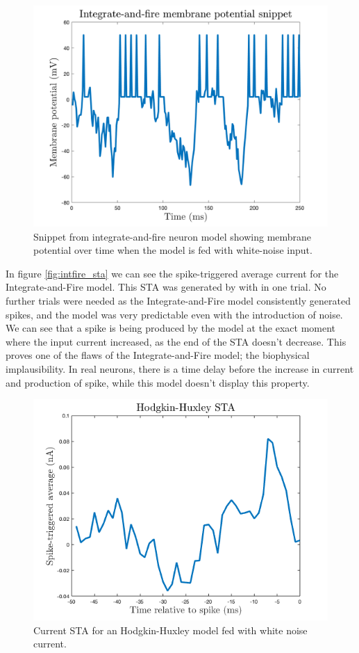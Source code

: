\documentclass[11pt]{article}
\begin{document}
\begin{figure}[H]
    \centering
    \includegraphics[width=5in]{figures/intfire_potential.png}
    \caption{Snippet from integrate-and-fire neuron model showing membrane potential over time when the model is fed with white-noise input.}
    \label{fig:intfire_potential}
\end{figure}

In figure \ref{fig:intfire_sta} we can see the spike-triggered average current for the Integrate-and-Fire model. This STA was generated by with in one trial. No further trials were needed as the Integrate-and-Fire model consistently generated spikes, and the model was very predictable even with the introduction of noise. We can see that a spike is being produced by the model at the exact moment where the input current increased, as the end of the STA doesn't decrease. This proves one of the flaws of the Integrate-and-Fire model; the biophysical implausibility. In real neurons, there is a time delay before the increase in current and production of spike, while this model doesn't display this property. 

\begin{figure}[H]
    \centering
    \includegraphics[width=4.5in]{figures/hh_sta_optimal.png}
    \caption{Current STA for an Hodgkin-Huxley model fed with white noise current.}
    \label{fig:hh_sta}
\end{figure}
\end{document}

